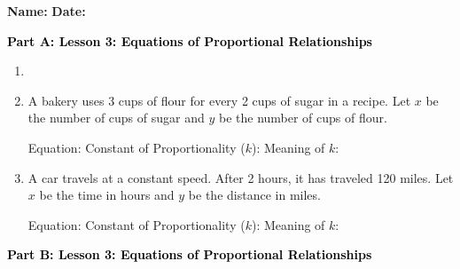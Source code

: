 \documentclass[12pt, letterpaper, fleqn]{article}
\newcommand{\blanklong}{\underline{\hspace{6.5cm}}}
\newcommand{\blankshorter}{\underline{\hspace{1.5cm}}}
\begin{document}
\textbf{Name:} \underline{\hspace{5cm}}
\hfill
\textbf{Date:} \underline{\hspace{3cm}}\\

\begin{tcolorbox}[colback=customteal!20]
\large\textcolor{black}{\textbf{Part A: Lesson 3: Equations of Proportional Relationships}}
\end{tcolorbox}

\vspace{3mm}

\begin{enumerate}[itemsep=5.5cm, leftmargin=0.6cm]
\item [label=\arabic*., itemsep=\fill, leftmargin=0.6cm]
\item A bakery uses 3 cups of flour for every 2 cups of sugar in a recipe. Let $x$ be the number of cups of sugar and $y$ be the number of cups of flour.
    \begin{tcolorbox}[colback=customteal!10, colframe=customteal!50]
    Equation: \blanklong
    Constant of Proportionality ($k$): \blankshorter
    Meaning of $k$: \blanklong
    \end{tcolorbox}
\item A car travels at a constant speed. After 2 hours, it has traveled 120 miles. Let $x$ be the time in hours and $y$ be the distance in miles.
    \begin{tcolorbox}[colback=customteal!10, colframe=customteal!50]
    Equation: \blanklong
    Constant of Proportionality ($k$): \blankshorter
    Meaning of $k$: \blanklong
    \end{tcolorbox}
\end{enumerate}

\newpage

\begin{tcolorbox}[colback=customteal!20]
\large\textcolor{black}{\textbf{Part B: Lesson 3: Equations of Proportional Relationships}}
\end{tcolorbox}

\vspace{3mm}
\end{document}
